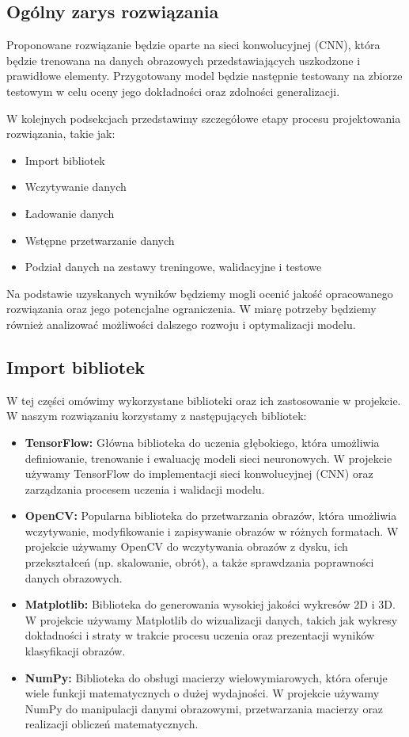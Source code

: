 \subsection{Ogólny zarys rozwiązania}
Proponowane rozwiązanie będzie oparte na sieci konwolucyjnej (CNN), która będzie trenowana na danych obrazowych przedstawiających uszkodzone i prawidłowe elementy. Przygotowany model będzie następnie testowany na zbiorze testowym w celu oceny jego dokładności oraz zdolności generalizacji.

W kolejnych podsekcjach przedstawimy szczegółowe etapy procesu projektowania rozwiązania, takie jak:

\begin{itemize}
\item Import bibliotek
\item Wczytywanie danych
\item Ładowanie danych
\item Wstępne przetwarzanie danych
\item Podział danych na zestawy treningowe, walidacyjne i testowe
\end{itemize}

Na podstawie uzyskanych wyników będziemy mogli ocenić jakość opracowanego rozwiązania oraz jego potencjalne ograniczenia. W miarę potrzeby będziemy również analizować możliwości dalszego rozwoju i optymalizacji modelu.

\subsection{Import bibliotek}
W tej części omówimy wykorzystane biblioteki oraz ich zastosowanie w projekcie. W naszym rozwiązaniu korzystamy z następujących bibliotek:

\begin{itemize}
\item \textbf{TensorFlow:} Główna biblioteka do uczenia głębokiego, która umożliwia definiowanie, trenowanie i ewaluację modeli sieci neuronowych. W projekcie używamy TensorFlow do implementacji sieci konwolucyjnej (CNN) oraz zarządzania procesem uczenia i walidacji modelu.

\item \textbf{OpenCV:} Popularna biblioteka do przetwarzania obrazów, która umożliwia wczytywanie, modyfikowanie i zapisywanie obrazów w różnych formatach. W projekcie używamy OpenCV do wczytywania obrazów z dysku, ich przekształceń (np. skalowanie, obrót), a także sprawdzania poprawności danych obrazowych.

\item \textbf{Matplotlib:} Biblioteka do generowania wysokiej jakości wykresów 2D i 3D. W projekcie używamy Matplotlib do wizualizacji danych, takich jak wykresy dokładności i straty w trakcie procesu uczenia oraz prezentacji wyników klasyfikacji obrazów.

\item \textbf{NumPy:} Biblioteka do obsługi macierzy wielowymiarowych, która oferuje wiele funkcji matematycznych o dużej wydajności. W projekcie używamy NumPy do manipulacji danymi obrazowymi, przetwarzania macierzy oraz realizacji obliczeń matematycznych.

\end{itemize}

